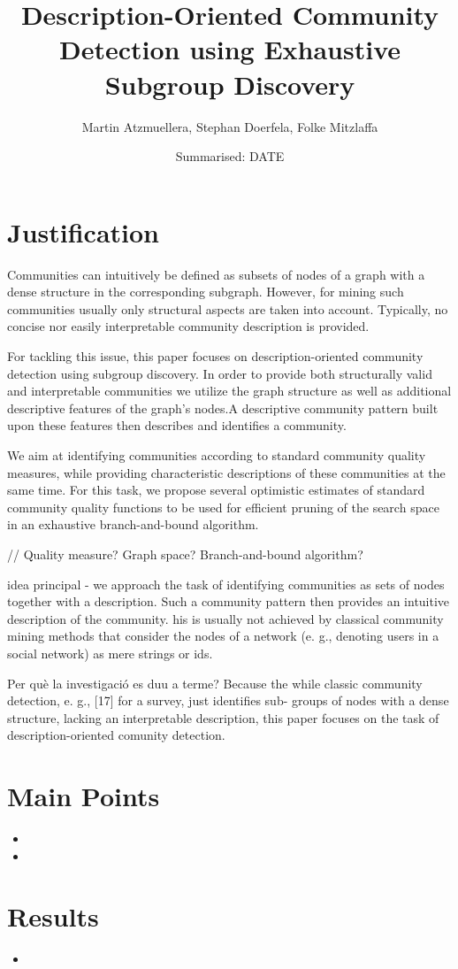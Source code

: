 \documentclass[a4paper]{article}
\title{Description-Oriented Community Detection using Exhaustive Subgroup Discovery}
\date{Summarised: DATE}
\author{Martin Atzmuellera, Stephan Doerfela, Folke Mitzlaffa}
\begin{document}
\maketitle
\section{Justification}
Communities can intuitively be defined as subsets of nodes of a graph with a dense structure in the corresponding subgraph. However, for mining such communities usually only structural aspects are taken into account. Typically, no concise nor easily interpretable community description is provided. 

For tackling this issue, this paper focuses on description-oriented community detection using subgroup discovery. In order to provide both structurally valid and interpretable communities we utilize the graph structure as well as additional descriptive features of the graph’s nodes.A descriptive community pattern built upon these features then describes and identifies a community.

We aim at identifying communities according to standard community quality measures, while providing characteristic descriptions of these communities at the same time. For this task, we propose several optimistic estimates of standard community quality functions to be used for efficient pruning of the search space in an exhaustive branch-and-bound algorithm.

//
Quality measure?
Graph space?
Branch-and-bound algorithm?

idea principal - we approach the task of identifying communities as sets of nodes together with a description. Such a community pattern then provides an intuitive description of the community. his is usually not achieved by classical community mining methods that consider the nodes of a network (e. g., denoting users in a social network) as mere strings or ids.

Per què la investigació es duu a terme?
Because the while classic community detection, e. g., [17] for a survey, just identifies sub- groups of nodes with a dense structure, lacking an interpretable description, this paper focuses on the task of description-oriented comunity detection.

\section{Main Points}
\begin{itemize}
  \item 
  \item 
\end{itemize}

\section{Results}
\begin{itemize}
  \item
\end{itemize}
\end{document}
